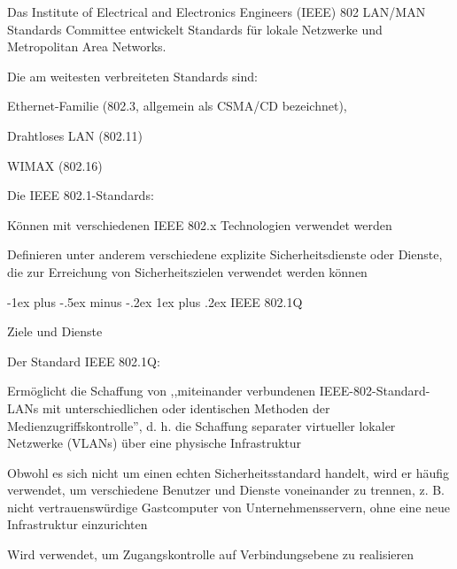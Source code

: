 \documentclass[a4paper]{article}
\makeatletter
\renewcommand{\subsubsection}{\@startsection{subsubsection}{3}{0mm}%
 {-1ex plus -.5ex minus -.2ex}%
 {1ex plus .2ex}%
 {\normalfont\small\bfseries}}
\makeatother
\begin{document}
\begin{multicols}{3}
      \begin{itemize*}
            \item Das Institute of Electrical and Electronics Engineers (IEEE) 802
            LAN/MAN Standards Committee entwickelt Standards für lokale Netzwerke
            und Metropolitan Area Networks.
            \item Die am weitesten verbreiteten Standards sind:
            \begin{itemize*}
                  \item Ethernet-Familie (802.3, allgemein als CSMA/CD bezeichnet),
                  \item Drahtloses LAN (802.11)
                  \item WIMAX (802.16)
            \end{itemize*}
            \item Die IEEE 802.1-Standards:
            \begin{itemize*}
                  \item Können mit verschiedenen IEEE 802.x Technologien verwendet werden
                  \item Definieren unter anderem verschiedene explizite Sicherheitsdienste oder Dienste, die zur Erreichung von Sicherheitszielen verwendet werden können
            \end{itemize*}
      \end{itemize*}


      \subsubsection{IEEE 802.1Q}

      Ziele und Dienste

      \begin{itemize*}
            \item Der Standard IEEE 802.1Q:
            \begin{itemize*}
                  \item Ermöglicht die Schaffung von ,,miteinander verbundenen IEEE-802-Standard-LANs mit unterschiedlichen oder identischen Methoden der Medienzugriffskontrolle'', d. h. die Schaffung separater virtueller lokaler Netzwerke (VLANs) über eine physische Infrastruktur
                  \item Obwohl es sich nicht um einen echten Sicherheitsstandard handelt, wird er häufig verwendet, um verschiedene Benutzer und Dienste voneinander zu trennen, z. B. nicht vertrauenswürdige Gastcomputer von Unternehmensservern, ohne eine neue Infrastruktur einzurichten
                  \item Wird verwendet, um Zugangskontrolle auf Verbindungsebene zu realisieren
            \end{itemize*}
      \end{itemize*}


\end{multicols}
\end{document}
